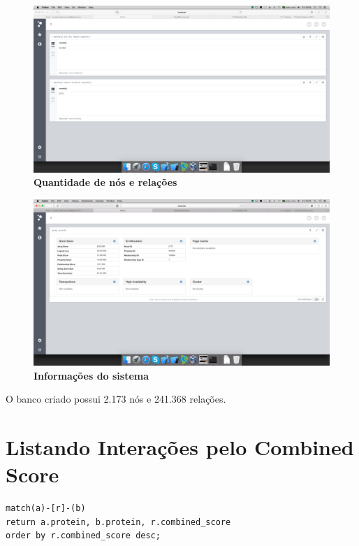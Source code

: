 \documentclass[a4paper, 12pt]{article}
\begin{document}
\begin{figure}[H]
  \centering
  \includegraphics[width=1\textwidth]{1}
  \caption[1 - Quantidade de nós e relações]{\textbf{Quantidade de nós e relações}}
\end{figure} 

\begin{figure}[H]
  \centering
  \includegraphics[width=1\textwidth]{2}
  \caption[2 - Informações do sistema]{\textbf{Informações do sistema}}
\end{figure}

O banco criado possui 2.173 nós e 241.368 relações.

\section{Listando Interações pelo Combined Score}

\begin{lstlisting}[frame=single]
match(a)-[r]-(b)
return a.protein, b.protein, r.combined_score
order by r.combined_score desc;
\end{lstlisting}
\end{document}
